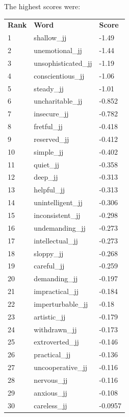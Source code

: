 \documentclass[10pt,letterpaper]{book}
\begin{document}
The highest scores were:
\begin{tabular}{ l l l }
        \textbf{Rank} & \textbf{Word} & \textbf{Score} \\
        1 & shallow\_jj & -1.49 \\
        2 & unemotional\_jj & -1.44 \\
        3 & unsophisticated\_jj & -1.19 \\
        4 & conscientious\_jj & -1.06 \\
        5 & steady\_jj & -1.01 \\
        6 & uncharitable\_jj & -0.852 \\
        7 & insecure\_jj & -0.782 \\
        8 & fretful\_jj & -0.418 \\
        9 & reserved\_jj & -0.412 \\
        10 & simple\_jj & -0.402 \\
        11 & quiet\_jj & -0.358 \\
        12 & deep\_jj & -0.313 \\
        13 & helpful\_jj & -0.313 \\
        14 & unintelligent\_jj & -0.306 \\
        15 & inconsistent\_jj & -0.298 \\
        16 & undemanding\_jj & -0.273 \\
        17 & intellectual\_jj & -0.273 \\
        18 & sloppy\_jj & -0.268 \\
        19 & careful\_jj & -0.259 \\
        20 & demanding\_jj & -0.197 \\
        21 & impractical\_jj & -0.184 \\
        22 & imperturbable\_jj & -0.18 \\
        23 & artistic\_jj & -0.179 \\
        24 & withdrawn\_jj & -0.173 \\
        25 & extroverted\_jj & -0.146 \\
        26 & practical\_jj & -0.136 \\
        27 & uncooperative\_jj & -0.116 \\
        28 & nervous\_jj & -0.116 \\
        29 & anxious\_jj & -0.108 \\
        30 & careless\_jj & -0.0957 \\
\end{tabular}
\end{document}
